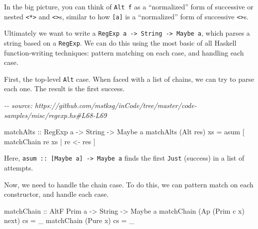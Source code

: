 \documentclass[]{article}
\newenvironment{Shaded}{}{}
\newcommand{\CommentTok}[1]{\textcolor[rgb]{0.38,0.63,0.69}{\textit{#1}}}
\newcommand{\DataTypeTok}[1]{\textcolor[rgb]{0.56,0.13,0.00}{#1}}
\newcommand{\NormalTok}[1]{#1}
\newcommand{\OperatorTok}[1]{\textcolor[rgb]{0.40,0.40,0.40}{#1}}
\newcommand{\OtherTok}[1]{\textcolor[rgb]{0.00,0.44,0.13}{#1}}
\begin{document}
In the big picture, you can think of \texttt{Alt\ f} as a ``normalized'' form of
successive or nested \texttt{\textless{}*\textgreater{}} and
\texttt{\textless{}\textbar{}\textgreater{}}s, similar to how \texttt{{[}a{]}}
is a ``normalized'' form of successive \texttt{\textless{}\textgreater{}}s.

Ultimately we want to write a
\texttt{RegExp\ a\ -\textgreater{}\ String\ -\textgreater{}\ Maybe\ a}, which
parses a string based on a \texttt{RegExp}. We can do this using the most basic
of all Haskell function-writing techniques: pattern matching on each case, and
handling each case.

First, the top-level \texttt{Alt} case. When faced with a list of chains, we can
try to parse each one. The result is the first success.

\begin{Shaded}
\begin{Highlighting}[]
\CommentTok{{-}{-} source: https://github.com/mstksg/inCode/tree/master/code{-}samples/misc/regexp.hs\#L68{-}L69}

\OtherTok{matchAlts ::} \DataTypeTok{RegExp}\NormalTok{ a }\OtherTok{{-}\textgreater{}} \DataTypeTok{String} \OtherTok{{-}\textgreater{}} \DataTypeTok{Maybe}\NormalTok{ a}
\NormalTok{matchAlts (}\DataTypeTok{Alt}\NormalTok{ res) xs }\OtherTok{=}\NormalTok{ asum [ matchChain re xs }\OperatorTok{|}\NormalTok{ re }\OtherTok{\textless{}{-}}\NormalTok{ res ]}
\end{Highlighting}
\end{Shaded}

Here, \texttt{asum\ ::\ {[}Maybe\ a{]}\ -\textgreater{}\ Maybe\ a} finds the
first \texttt{Just} (success) in a list of attempts.

Now, we need to handle the chain case. To do this, we can pattern match on each
constructor, and handle each case.

\begin{Shaded}
\begin{Highlighting}[]
\OtherTok{matchChain ::} \DataTypeTok{AltF} \DataTypeTok{Prim}\NormalTok{ a }\OtherTok{{-}\textgreater{}} \DataTypeTok{String} \OtherTok{{-}\textgreater{}} \DataTypeTok{Maybe}\NormalTok{ a}
\NormalTok{matchChain (}\DataTypeTok{Ap}\NormalTok{ (}\DataTypeTok{Prim}\NormalTok{ c x) next) cs }\OtherTok{=}\NormalTok{ \_}
\NormalTok{matchChain (}\DataTypeTok{Pure}\NormalTok{ x)             cs }\OtherTok{=}\NormalTok{ \_}
\end{Highlighting}
\end{Shaded}
\end{document}

